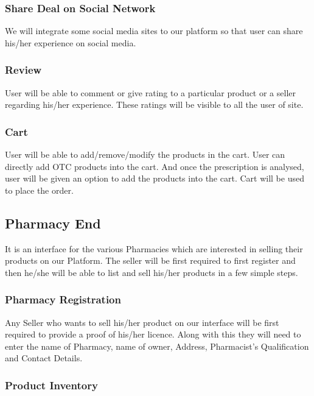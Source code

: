 \documentclass[fleqn,10pt]{../SelfArx} %
\begin{document}
\subsubsection{Share Deal on Social Network}
We will integrate some social media sites to our platform so that user can share his/her experience on social media.
\subsubsection{Review}
User will be able to comment or give rating to a particular product or a seller regarding his/her experience. These ratings will be visible to all the user of site.
\subsubsection{Cart}
User will be able to add/remove/modify the products in the cart. User can directly add OTC products into the cart. And once the prescription is analysed, user will be given an option to add the products into the cart. Cart will be used to place the order.

\subsection{Pharmacy End}

It is an interface for the various Pharmacies which are interested in selling their products on our Platform. The seller will be first required to first register and then he/she will be able to list and sell his/her products in a few simple steps.
\subsubsection{Pharmacy Registration}

Any Seller who wants to sell his/her product on our interface will be first required to provide a proof of his/her licence. Along with this they will need to enter the name of Pharmacy, name of owner, Address, Pharmacist’s Qualification and Contact Details. 
\subsubsection{Product Inventory}
\end{document}
